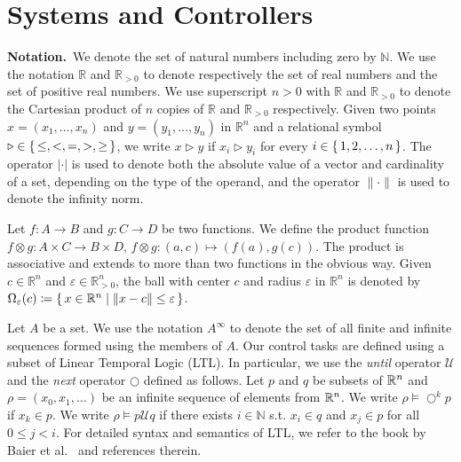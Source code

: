 
\section{Systems and Controllers}
%
\noindent\textbf{Notation.}\
We denote the set of natural numbers including zero by $\mathbb N$.
We use the notation $\mathbb{R}$ and $\mathbb{R}_{>0}$ to denote respectively the set of real numbers and the set of positive real numbers.
We use superscript $n>0$ with $\mathbb{R}$ and $\mathbb{R}_{>0}$ to denote the Cartesian product of $n$ copies of $\mathbb{R}$ and $\mathbb{R}_{>0}$ respectively.
Given two points $x=(x_1,\ldots, x_n)$ and $y=(y_1,\ldots, y_n)$ in $ \mathbb{R}^n$
and a relational symbol $\triangleright\in \set{\leq, <, = , >, \geq}$, we write $x\triangleright y$ if $x_i\triangleright y_i$ for every $i\in\set{1,2,\ldots,n}$.
The operator $|\cdot |$ is used to denote both the absolute value of a vector and cardinality of a set, depending on the type of the operand, and the operator $\| \cdot \|$ is used to denote the infinity norm.  

Let $f\colon A\to B$ and $g\colon C\to D$ be two functions.
We define the product function $f\otimes g\colon A\times C\to B\times D $, $f\otimes g \colon (a,c)\mapsto (f(a),g(c))$.
The product is associative and extends to more than two functions in the obvious way.
%
Given $c\in \mathbb{R}^n$ and $\varepsilon\in \mathbb{R}_{>0}^{n}$, the ball with center $c$ and radius $\varepsilon$ in $\mathbb{R}^n$ is denoted by 
$\Omega_\varepsilon(c)\coloneqq \set{x \in \mathbb{R}^n \mid  \|x-c\|\leq \varepsilon }$.

Let $A$ be a set.
We use the notation $A^\infty$ to denote the set of all finite and infinite sequences formed using the members of $A$. Our control tasks are defined using a subset of Linear Temporal Logic (LTL). 
In particular, we use the \emph{until} operator $\mathcal{U}$ and the \emph{next} operator $\bigcirc$ defined as follows. 
Let $p$ and $q$ be subsets of $\mathbb{R}^n$ and $\rho=(x_0,x_1,\dots)$ be an infinite sequence of elements from $\mathbb{R}^n$. 
We write $\rho\models\bigcirc^k p$ if $x_k\in p$. We write $\rho\models p\mathcal{U}q$ if there exists 
$i\in\mathbb{N}$ s.t. $x_i\in q$ and $x_j\in p$ for all $0\leq j<i$. 
For detailed syntax and semantics of LTL, we refer to the book by Baier et al.~\cite{baier2008principles} and references therein.

